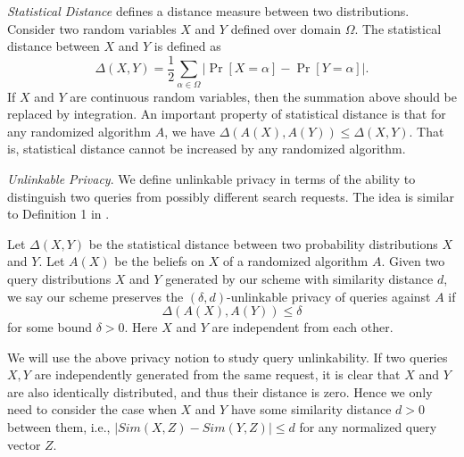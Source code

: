 \documentclass{IEEEtran}
\begin{document}
\emph{Statistical Distance} \cite{AB09,G95} defines a distance measure between two distributions. Consider two random variables $X$ and $Y$ defined over domain $\Omega$. The statistical distance between $X$ and $Y$ is defined as
$$\Delta(X,Y) = \frac{1}{2}\sum_{\alpha\in\Omega} |\Pr[X=\alpha] - \Pr[Y=\alpha]|.$$
If $X$ and $Y$ are continuous random variables, then the summation above should be replaced by integration.
An important property of statistical distance is that for any randomized algorithm $A$, we have $\Delta(A(X),A(Y))\leq\Delta(X,Y)$. That is, statistical distance cannot be increased by any randomized algorithm.

\emph{Unlinkable Privacy}. We define unlinkable privacy in terms of the ability to distinguish two queries from possibly different search requests. The idea is similar to Definition 1 in \cite{K09}.
\begin{definition}
Let $\Delta(X, Y)$ be the statistical distance between two probability distributions $X$ and $Y$. Let $A(X)$ be the beliefs on $X$ of a randomized algorithm $A$. Given two query distributions $X$ and $Y$ generated by our scheme with similarity distance $d$, we say our scheme preserves the $(\delta, d)$-unlinkable privacy of queries against $A$ if
$$\Delta(A(X), A(Y)) \leq \delta$$
for some bound $\delta > 0$. Here $X$ and $Y$ are independent from each other.
\end{definition}
We will use the above privacy notion to study query unlinkability. 
If two queries $X, Y$ are independently generated from the same request, it is clear that $X$ and $Y$ are also identically distributed, and thus their distance is zero. Hence we only need to consider the case when $X$ and $Y$ have some similarity distance $d>0$ between them, i.e., $|Sim(X, Z) - Sim(Y,Z)| \leq d$ for any normalized query vector $Z$.
\end{document}
